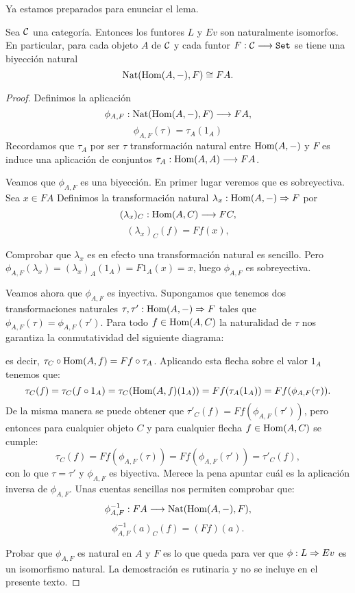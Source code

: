Ya estamos preparados para enunciar el lema.
\begin{theorem}
  Sea $\mathcal{C}$ una categoría. Entonces los funtores $L$ y $Ev$ son naturalmente isomorfos.
  En particular, para cada objeto $A$ de $\mathcal{C}$ y cada funtor $F : \mathcal{C}\longrightarrow \texttt{Set}$
  se tiene una biyección natural
  $$\operatorname{Nat}(\operatorname{Hom}(A, -), F) \cong FA.$$
\end{theorem}
\begin{proof}
  Definimos la aplicación
  $$\phi_{A, F} : \operatorname{Nat}(\operatorname{Hom}(A, -), F)\longrightarrow FA,$$
  $$\phi_{A, F}(\tau) = \tau_A (1_A)$$
  Recordamos que $\tau_A$ por ser $\tau$ transformación natural entre $\operatorname{Hom}(A, -)$ y $F$ es
  induce una aplicación de conjuntos $\tau_A : \operatorname{Hom}(A, A)\longrightarrow F A$.

  Veamos que $\phi_{A, F}$ es una biyección. En primer lugar veremos que es sobreyectiva. Sea $x \in FA$
  Definimos la transformación natural $\lambda_x : \operatorname{Hom}(A, -)\Rightarrow F$ por
  $$(\lambda_x)_C : \operatorname{Hom}(A, C)\longrightarrow F C,$$
  $$(\lambda_x)_C(f) = Ff(x),$$

  Comprobar que $\lambda_x$ es en efecto una transformación natural es sencillo. Pero
  $\phi_{A, F}(\lambda_x) = (\lambda_x)_A (1_A) = F1_A(x) = x$, luego $\phi_{A, F}$
  es sobreyectiva.

  Veamos ahora que $\phi_{A, F}$ es inyectiva. Supongamos que tenemos
  dos transformaciones naturales $\tau, \tau' : \operatorname{Hom}(A, -)\Rightarrow F$
  tales que $\phi_{A, F}(\tau) = \phi_{A, F}(\tau')$. Para todo $f \in \operatorname{Hom}(A, C)$
  la naturalidad de $\tau$ nos garantiza la conmutatividad
  del siguiente diagrama:
  \begin{center}
  \end{center}
  es decir, $\tau_C \circ \operatorname{Hom}(A, f) = F f \circ \tau_A$. Aplicando
  esta flecha sobre el valor $1_A$ tenemos que:
$$\tau_C(f) = \tau_C(f \circ 1_A) = \tau_C(\operatorname{Hom}(A, f)(1_A)) = F f(\tau_A(1_A)) = Ff(\phi_{A, F}(\tau)).$$
  De la misma manera se puede obtener que $\tau'_C(f)  = Ff(\phi_{A, F}(\tau'))$, pero entonces para cualquier objeto $C$ y para cualquier flecha $f \in \operatorname{Hom}(A, C)$
  se cumple:
  $$\tau_C(f) = Ff (\phi_{A,F}(\tau)) = Ff(\phi_{A, F}(\tau')) = \tau'_C(f),$$
  con lo que $\tau = \tau'$ y $\phi_{A, F}$ es biyectiva.
  Merece la pena apuntar cuál es la aplicación inversa de $\phi_{A, F}$.
  Unas cuentas sencillas nos permiten comprobar que:
  $$\phi_{A,F}^{-1} : FA\longrightarrow \operatorname{Nat}(\operatorname{Hom}(A, -), F),$$
  $$\phi_{A,F}^{-1}(a)_C(f) = (Ff)(a).$$

  Probar que $\phi_{A, F}$ es natural en $A$ y $F$ es lo que queda para ver
  que $\phi : L\Rightarrow Ev$ es un isomorfismo natural. La demostración es
  rutinaria y no se incluye en el presente texto.
\end{proof}

